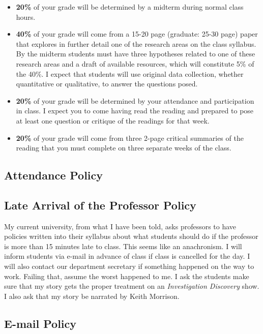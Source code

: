 \documentclass[11pt,]{article}
\begin{document}
\begin{itemize}
\item
  \textbf{20\%} of your grade will be determined by a midterm during
  normal class hours.
\item
  \textbf{40\%} of your grade will come from a 15-20 page (graduate:
  25-30 page) paper that explores in further detail one of the research
  areas on the class syllabus. By the midterm students must have three
  hypotheses related to one of these research areas and a draft of
  available resources, which will constitute 5\% of the 40\%. I expect
  that students will use original data collection, whether quantitative
  or qualitative, to answer the questions posed.
\item
  \textbf{20\%} of your grade will be determined by your attendance and
  participation in class. I expect you to come having read the reading
  and prepared to pose at least one question or critique of the readings
  for that week.
\item
  \textbf{20\%} of your grade will come from three 2-page critical
  summaries of the reading that you must complete on three separate
  weeks of the class.
\end{itemize}

\hypertarget{attendance-policy}{%
\subsection{Attendance Policy}\label{attendance-policy}}

\hypertarget{late-arrival-of-the-professor-policy}{%
\subsection{Late Arrival of the Professor
Policy}\label{late-arrival-of-the-professor-policy}}

My current university, from what I have been told, asks professors to
have policies written into their syllabus about what students should do
if the professor is more than 15 minutes late to class. This seems like
an anachronism. I will inform students via e-mail in advance of class if
class is cancelled for the day. I will also contact our department
secretary if something happened on the way to work. Failing that, assume
the worst happened to me. I ask the students make sure that my story
gets the proper treatment on an \emph{Investigation Discovery} show. I
also ask that my story be narrated by Keith Morrison.

\hypertarget{e-mail-policy}{%
\subsection{E-mail Policy}\label{e-mail-policy}}
\end{document}

